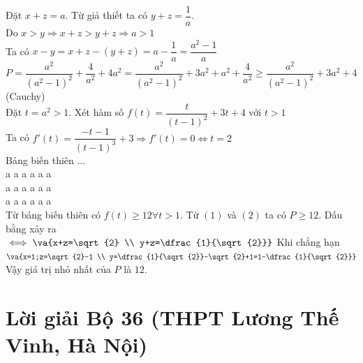 \lgi 
Đặt $x+z=a$. Từ giả thiết ta có $y+z=\dfrac{1}{a}$.\\
Do $x>y\Rightarrow x+z>y+z\Rightarrow a>1$\\
Ta có $x-y=x+z-(y+z)=a-\dfrac{1}{a}=\dfrac{a^2-1}{a}$\\
$P=\dfrac{a^2}{(a^2-1)^2}+\dfrac{4}{a^2}+4a^2=\dfrac{a^2}{(a^2-1)^2}+3a^2+a^2+\dfrac{4}{a^2}\ge \dfrac{a^2}{(a^2-1)^2}+3a^2+4$ (Cauchy)\\
Đặt $t=a^2>1$. Xét hàm số $f(t)=\dfrac{t}{(t-1)^2}+3t+4$ với $t>1$\\
Ta có $f'(t)=\dfrac{-t-1}{(t-1)^3}+3\Rightarrow f'(t)=0\iff t=2$\\
Bảng biến thiên ...\\
a a a a a a\\
a a a a a a\\
a a a a a a\\
Từ bảng biến thiên có  $f(t)\ge 12\forall t>1$. Từ $(1)$ và $(2)$ ta có $P\ge 12$. Dấu bằng xảy ra\\
$\iff \va{x+z=\sqrt{2} \\ y+z=\dfrac{1}{\sqrt{2}}}$ Khi chẳng hạn $\va{x=1;z=\sqrt{2}-1 \\ y=\dfrac{1}{\sqrt{2}}-\sqrt{2}+1=1-\dfrac{1}{\sqrt{2}}}$\\
Vậy giá trị nhỏ nhất của $P$ là $12$.

\section{Lời giải Bộ 36 (THPT Lương Thế Vinh, Hà Nội) }

\lgi 
\vspace{5cm}

